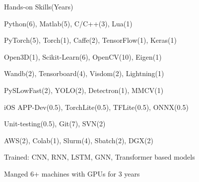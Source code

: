 \documentclass{resume} %
\begin{document}
\begin{paracol}{2}
\begin{rSection}{Hands-on Skills}{(Years)} 
\begin{sSubsection}{Python(6), Matlab(5), C/C++(3), Lua(1)}\end{sSubsection}
\begin{sSubsection}{PyTorch(5), Torch(1), Caffe(2), TensorFlow(1), Keras(1)}\end{sSubsection}
\begin{sSubsection}{Open3D(1), Scikit-Learn(6), OpenCV(10), Eigen(1)}\end{sSubsection}
\begin{sSubsection}{Wandb(2), Tensorboard(4), Visdom(2), Lightning(1)}\end{sSubsection}
\begin{sSubsection}{PySLowFast(2), YOLO(2), Detectron(1), MMCV(1)}\end{sSubsection}
\begin{sSubsection}{iOS APP-Dev(0.5), TorchLite(0.5), TFLite(0.5), ONNX(0.5)}\end{sSubsection}
\begin{sSubsection}{Unit-testing(0.5), Git(7), SVN(2)}\end{sSubsection} %
\begin{sSubsection}{AWS(2), Colab(1), Slurm(4), Sbatch(2), DGX(2)}\end{sSubsection}
\begin{sSubsection}{Trained: CNN, RNN, LSTM, GNN, Transformer based models}\end{sSubsection}
\begin{sSubsection}{Manged 6+ machines with GPUs for 3 years }\end{sSubsection}
\end{rSection}

\end{paracol}
\end{document}
